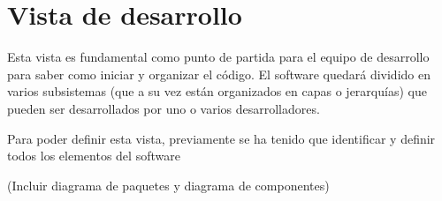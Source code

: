\chapter{Vista de desarrollo}
Esta vista es fundamental como punto de partida para el equipo de desarrollo para saber como iniciar y organizar el código. El software quedará dividido en varios subsistemas (que a su vez están organizados en capas o jerarquías) que pueden ser desarrollados por uno o varios desarrolladores.

Para poder definir esta vista, previamente se ha tenido que identificar y definir todos los elementos del software

(Incluir diagrama de paquetes y diagrama de componentes)
